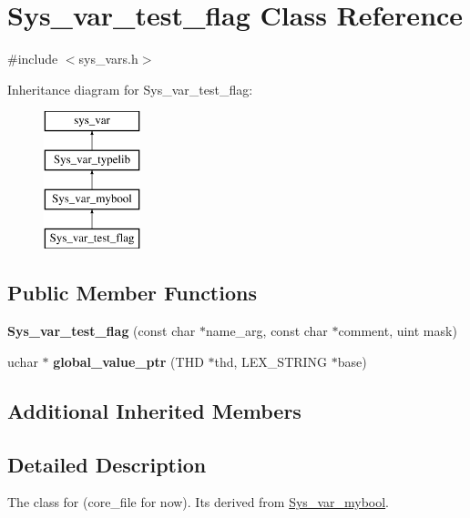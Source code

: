 \hypertarget{classSys__var__test__flag}{}\section{Sys\+\_\+var\+\_\+test\+\_\+flag Class Reference}
\label{classSys__var__test__flag}


{\ttfamily \#include $<$sys\+\_\+vars.\+h$>$}

Inheritance diagram for Sys\+\_\+var\+\_\+test\+\_\+flag\+:\begin{figure}[H]
\begin{center}
\leavevmode
\includegraphics[height=4.000000cm]{classSys__var__test__flag}
\end{center}
\end{figure}
\subsection*{Public Member Functions}
\begin{DoxyCompactItemize}
\item 
\mbox{\label{classSys__var__test__flag_ace0c6f959b2c4bee6c1309edee8a25d0}} 
{\bfseries Sys\+\_\+var\+\_\+test\+\_\+flag} (const char $\ast$name\+\_\+arg, const char $\ast$comment, uint mask)
\item 
\mbox{\label{classSys__var__test__flag_a3376e487b8a3f127d0df626e32d4db3c}} 
uchar $\ast$ {\bfseries global\+\_\+value\+\_\+ptr} (T\+HD $\ast$thd, L\+E\+X\+\_\+\+S\+T\+R\+I\+NG $\ast$base)
\end{DoxyCompactItemize}
\subsection*{Additional Inherited Members}


\subsection{Detailed Description}
The class for  (core\+\_\+file for now). It\textquotesingle{}s derived from \mbox{\hyperlink{classSys__var__mybool}{Sys\+\_\+var\+\_\+mybool}}.

